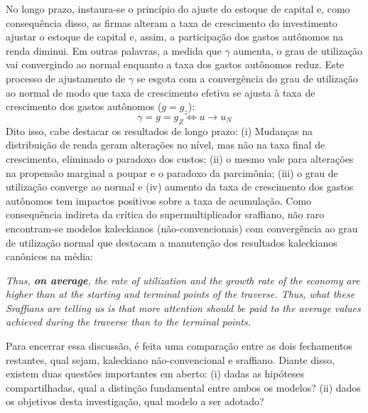 No longo prazo, instaura-se o princípio do ajuste do estoque de capital e, como consequência disso, as firmas alteram a taxa de crescimento do investimento ajustar o estoque de capital e, assim, a participação dos gastos autônomos na renda diminui.
Em outras palavras, a medida que $\gamma$ aumenta, o grau de utilização vai convergindo ao normal enquanto a taxa dos gastos autônomos reduz.
Este processo de ajustamento de $\gamma$ se esgota com a convergência do grau de utilização ao normal de modo que 
taxa de crescimento efetiva se ajusta à taxa de crescimento dos gastos autônomos ($g = g_z$): 
$$
\gamma = g = g_Z \Leftrightarrow u \to u_N
$$
Dito isso, cabe destacar os resultados de longo prazo:
(i) Mudanças na distribuição de renda geram alterações no nível, mas não na taxa final de crescimento, eliminado o paradoxo dos custos; 
(ii) o mesmo vale para alterações na propensão marginal a poupar e o paradoxo da parcimônia; 
(iii) o grau de utilização converge ao normal e 
(iv) aumento da taxa de crescimento dos gastos autônomos tem impactos positivos sobre a taxa de acumulação.
Como consequência indireta da crítica do supermultiplicador sraffiano, não raro encontram-se modelos kaleckianos (não-convencionais) com convergência ao grau de utilização normal que destacam a manutenção dos resultados kaleckianos canônicos na média:
	
	\begin{citacao}
		\textit{Thus, \textbf{on average}, the rate of utilization and the growth rate of the economy are higher than at the starting and terminal points of the traverse. Thus, what these Sraffians are telling us is that more attention should be paid to the average values
		achieved during the traverse than to the terminal points.} \cite[p.~408, grifos adicionados]{lavoie_post-keynesian_2015}
	\end{citacao}	

Para encerrar essa discussão, é feita uma comparação entre as dois fechamentos restantes, qual sejam, kaleckiano não-convencional e sraffiano.  Diante disso, existem duas questões importantes em aberto: (i) dadas as hipóteses compartilhadas, qual a distinção fundamental entre ambos os modelos? (ii) dados os objetivos desta investigação, qual modelo a ser adotado? 

